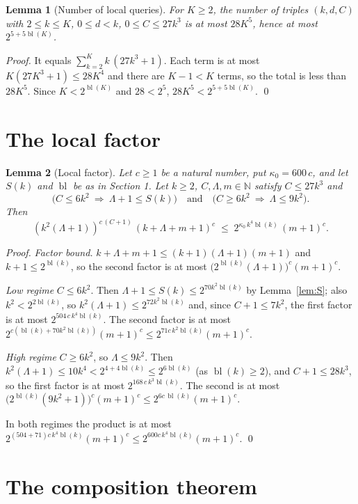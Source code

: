 \documentclass[11pt]{article}
\newtheorem{lemma}{Lemma}
\newcommand{\N}{\mathbb N}
\newcommand{\bl}{\operatorname{bl}}
\begin{document}
\begin{lemma}[Number of local queries]\label{lem:count}
For $K\ge2$, the number of triples $(k,d,C)$ with $2\le k\le K$, $0\le d<k$, $0\le C\le27k^3$ is at most $28K^5$, hence at most $2^{5+5\bl(K)}$.
\end{lemma}
\begin{proof}
It equals $\sum_{k=2}^K k\,(27k^3+1)$. Each term is at most $K(27K^3+1)\le28K^4$ and there are $K-1<K$ terms, so the total is less than $28K^5$. Since $K<2^{\bl(K)}$ and $28<2^5$, $28K^5<2^{5+5\bl(K)}$. \qed
\end{proof}

\section{The local factor}

\begin{lemma}[Local factor]\label{lem:local}
Let $c\ge1$ be a natural number, put $\kappa_0=600\,c$, and let $S(k)$ and $\bl$ be as in Section 1. Let $k\ge2$, $C,\Lambda,m\in\N$ satisfy $C\le27k^3$ and
\[
\bigl(C\le 6k^2\ \Rightarrow\ \Lambda+1\le S(k)\bigr)\quad\text{and}\quad\bigl(C\ge6k^2\ \Rightarrow\ \Lambda\le 9k^2\bigr).
\]
Then
\[
(k^2(\Lambda+1))^{c\,(C+1)}\,(k+\Lambda+m+1)^{c}\;\le\;2^{\kappa_0\,k^4\bl(k)}\,(m+1)^{c}.
\]
\end{lemma}
\begin{proof}
\emph{Factor bound.} $k+\Lambda+m+1\le(k+1)(\Lambda+1)(m+1)$ and $k+1\le2^{\bl(k)}$, so the second factor is at most $\bigl(2^{\bl(k)}(\Lambda+1)\bigr)^{c}(m+1)^{c}$.

\emph{Low regime} $C\le6k^2$. Then $\Lambda+1\le S(k)\le2^{70k^2\bl(k)}$ by Lemma~\ref{lem:S}; also $k^2<2^{2\bl(k)}$, so $k^2(\Lambda+1)\le 2^{72k^2\bl(k)}$ and, since $C+1\le7k^2$, the first factor is at most $2^{504\,c\,k^4\bl(k)}$. The second factor is at most $2^{c(\bl(k)+70k^2\bl(k))}(m+1)^c\le2^{71c\,k^2\bl(k)}(m+1)^c$.

\emph{High regime} $C\ge6k^2$, so $\Lambda\le9k^2$. Then $k^2(\Lambda+1)\le10k^4<2^{4+4\bl(k)}\le2^{6\bl(k)}$ (as $\bl(k)\ge2$), and $C+1\le28k^3$, so the first factor is at most $2^{168\,c\,k^3\bl(k)}$. The second is at most $\bigl(2^{\bl(k)}(9k^2+1)\bigr)^c(m+1)^c\le2^{6c\,\bl(k)}(m+1)^c$.

In both regimes the product is at most $2^{(504+71)c\,k^4\bl(k)}(m+1)^c\le2^{600c\,k^4\bl(k)}(m+1)^c$. \qed
\end{proof}

\section{The composition theorem}
\end{document}
